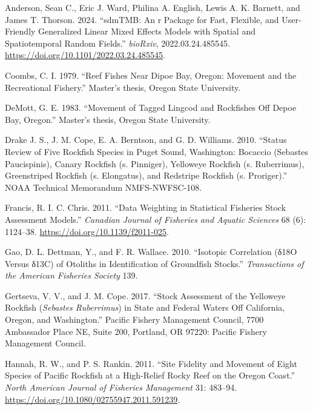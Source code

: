\documentclass[
]{scrartcl}
\newlength{\cslhangindent}
\newenvironment{CSLReferences}[2] %
 {\begin{list}{}{%
  \setlength{\itemindent}{0pt}
  \setlength{\leftmargin}{0pt}
  \setlength{\parsep}{0pt}
  \ifodd #1
   \setlength{\leftmargin}{\cslhangindent}
   \setlength{\itemindent}{-1\cslhangindent}
  \fi
  \setlength{\itemsep}{#2\baselineskip}}}
 {\end{list}}
\begin{document}
\label{refs}
\begin{CSLReferences}{1}{0}
Anderson, Sean C., Eric J. Ward, Philina A. English, Lewis A. K.
Barnett, and James T. Thorson. 2024. {``sdmTMB: An r Package for Fast,
Flexible, and User-Friendly Generalized Linear Mixed Effects Models with
Spatial and Spatiotemporal Random Fields.''} \emph{bioRxiv},
2022.03.24.485545. \url{https://doi.org/10.1101/2022.03.24.485545}.

Coombs, C. I. 1979. {``Reef Fishes Near Dipoe Bay, Oregon: Movement and
the Recreational Fishery.''} Master's thesis, Oregon State University.

DeMott, G. E. 1983. {``Movement of Tagged Lingcod and Rockfishes Off
Depoe Bay, Oregon.''} Master's thesis, Oregon State University.

Drake J. S., J. M. Cope, E. A. Berntson, and G. D. Williams. 2010.
{``Status Review of Five Rockfish Species in Puget Sound, Washington:
Bocaccio (Sebastes Paucispinis), Canary Rockfish (s. Pinniger),
Yelloweye Rockfish (s. Ruberrimus), Greenstriped Rockfish (s.
Elongatus), and Redstripe Rockfish (s. Proriger).''} NOAA Technical
Memorandum NMFS-NWFSC-108.

Francis, R. I. C. Chris. 2011. {``Data Weighting in Statistical
Fisheries Stock Assessment Models.''} \emph{Canadian Journal of
Fisheries and Aquatic Sciences} 68 (6): 1124--38.
\url{https://doi.org/10.1139/f2011-025}.

Gao, D. L. Dettman, Y., and F. R. Wallace. 2010. {``Isotopic Correlation
(δ18O Versus δ13C) of Otoliths in Identification of Groundfish
Stocks.''} \emph{Transactions of the American Fisheries Society} 139.

Gertseva, V. V., and J. M. Cope. 2017. {``Stock Assessment of the
Yelloweye Rockfish (\emph{{Sebastes} Ruberrimus}) in State and {Federal}
Waters Off {California}, {Oregon}, and {Washington}.''} Pacific Fishery
Management Council, 7700 Ambassador Place NE, Suite 200, Portland, OR
97220: Pacific Fishery Management Council.

Hannah, R. W., and P. S. Rankin. 2011. {``Site Fidelity and Movement of
Eight Species of Pacific Rockfish at a High-Relief Rocky Reef on the
Oregon Coast.''} \emph{North American Journal of Fisheries Management}
31: 483--94. \url{https://doi.org/10.1080/02755947.2011.591239}.


\end{CSLReferences}
\end{document}
